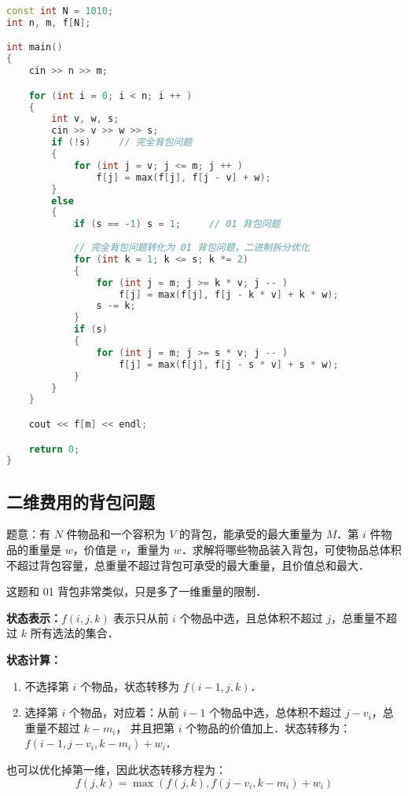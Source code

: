 \begin{lstlisting}[language=cpp]
const int N = 1010;
int n, m, f[N];

int main()
{
    cin >> n >> m;

    for (int i = 0; i < n; i ++ )
    {
        int v, w, s;
        cin >> v >> w >> s;
        if (!s)     // 完全背包问题
        {
            for (int j = v; j <= m; j ++ )
                f[j] = max(f[j], f[j - v] + w);
        }
        else
        {
            if (s == -1) s = 1;     // 01 背包问题
            
            // 完全背包问题转化为 01 背包问题，二进制拆分优化
            for (int k = 1; k <= s; k *= 2)
            {
                for (int j = m; j >= k * v; j -- )
                    f[j] = max(f[j], f[j - k * v] + k * w);
                s -= k;
            }
            if (s)
            {
                for (int j = m; j >= s * v; j -- )
                    f[j] = max(f[j], f[j - s * v] + s * w);
            }
        }
    }

    cout << f[m] << endl;

    return 0;
}
\end{lstlisting}

\subsection{二维费用的背包问题}

题意：有 $N$ 件物品和一个容积为 $V$ 的背包，能承受的最大重量为 $M$．第 $i$ 件物品的重量是 $w$，价值是 $v$，重量为 $w$．求解将哪些物品装入背包，可使物品总体积不超过背包容量，总重量不超过背包可承受的最大重量，且价值总和最大．

这题和 01 背包非常类似，只是多了一维重量的限制．

\textbf{状态表示：$f(i, j, k)$} 表示只从前 $i$ 个物品中选，且总体积不超过 $j$，总重量不超过 $k$ 所有选法的集合．

\textbf{状态计算：}

\begin{enumerate}
\item 不选择第 $i$ 个物品，状态转移为 $f(i - 1, j, k)$．
\item 选择第 $i$ 个物品，对应着：从前 $i - 1$ 个物品中选，总体积不超过 $j - v_i$，总重量不超过 $k - m_i$， 并且把第 $i$ 个物品的价值加上．状态转移为：$f(i - 1, j - v_i, k - m_i) + w_i$．
\end{enumerate}

也可以优化掉第一维，因此状态转移方程为：
\begin{equation}
f(j, k) = \max(f(j, k), f(j - v_i, k - m_i) + w_i)
\end{equation}

